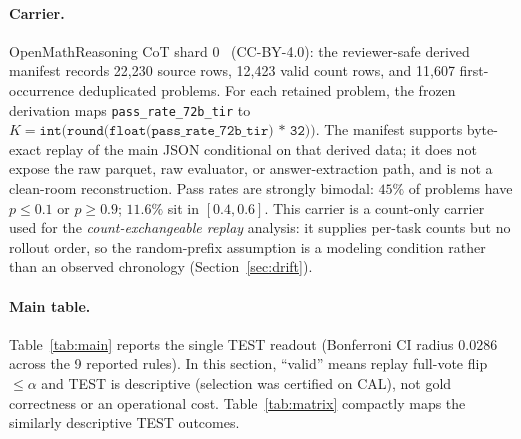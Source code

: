 \documentclass{article}
\theoremstyle{definition}
\theoremstyle{remark}
\begin{document}
\paragraph{Carrier.} OpenMathReasoning CoT shard 0~\citep{moshkov2025openmathreasoning} (CC-BY-4.0): the
reviewer-safe derived manifest records 22{,}230 source rows, 12{,}423 valid
count rows, and 11{,}607 first-occurrence deduplicated problems. For each
retained problem, the frozen derivation maps \texttt{pass\_rate\_72b\_tir} to
$K=\texttt{int(round(float(pass\_rate\_72b\_tir) * 32))}$. The manifest
supports byte-exact replay of the main JSON conditional on that derived data;
it does not expose the raw parquet, raw evaluator, or answer-extraction path,
and is not a clean-room reconstruction. Pass rates are strongly bimodal: $45\%$ of problems
have $p\le0.1$ or $p\ge0.9$; $11.6\%$ sit in $[0.4,0.6]$. This carrier is a
count-only carrier used for the \emph{count-exchangeable replay} analysis:
it supplies per-task counts but no rollout order, so the random-prefix
assumption is a modeling condition rather than an observed chronology
(Section~\ref{sec:drift}).

\paragraph{Main table.} Table~\ref{tab:main} reports the single TEST readout
(Bonferroni CI radius $0.0286$ across the 9 reported rules). In this section,
``valid'' means replay full-vote flip $\le\alpha$ and TEST is descriptive
(selection was certified on CAL), not gold correctness or an operational cost.
Table~\ref{tab:matrix} compactly maps the similarly descriptive TEST outcomes.
\end{document}
